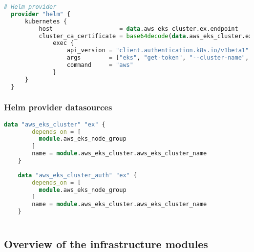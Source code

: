 \begin{lstlisting}[language=terraform]
  # Helm provider
  provider "helm" {
      kubernetes {
          host                   = data.aws_eks_cluster.ex.endpoint
          cluster_ca_certificate = base64decode(data.aws_eks_cluster.ex.certificate_authority[0].data)
              exec {
                  api_version = "client.authentication.k8s.io/v1beta1"
                  args        = ["eks", "get-token", "--cluster-name", data.aws_eks_cluster.ex.id]
                  command     = "aws"
              }
      }
  }
\end{lstlisting}

\subsubsection{
{Helm provider datasources}}
\label{sec:Helm provider datasources}

\begin{lstlisting}[language=terraform]
    data "aws_eks_cluster" "ex" {
        depends_on = [
          module.aws_eks_node_group
        ]
        name = module.aws_eks_cluster.aws_eks_cluster_name
    }
    
    data "aws_eks_cluster_auth" "ex" {
        depends_on = [
          module.aws_eks_node_group
        ]
        name = module.aws_eks_cluster.aws_eks_cluster_name
    }
    
\end{lstlisting}

\subsection{
{Overview of the infrastructure modules}}
\label{sec:Overzicht van de infrastructuur modules}

